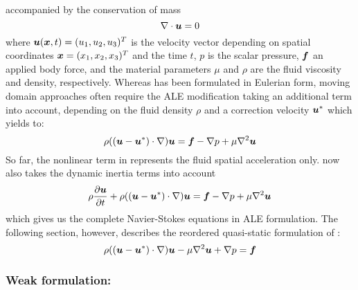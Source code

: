 accompanied by the conservation of mass
\begin{equation}
  \diverg{\vect{u}}=0
  \label{eqn:NavierStokesmasequation}
\end{equation}
where $\vect{u}(\vect{x},t)=(u_1,u_2,u_3)^T$ is the velocity vector depending on spatial coordinates $\vect{x}=(x_1,x_2,x_3)^T$ and the time $t$, $p$ is the scalar pressure, $\vect{f}$ an applied body force, and the material parameters $\mu$ and $\rho$ are the fluid viscosity and density, respectively. Whereas  has been formulated in Eulerian form, moving domain approaches often require the ALE modification taking an additional term into account, depending on the fluid density $\rho$ and a correction velocity $\vect{u}^*$ which yields to:
\begin{equation}
    \rho((\vect{u}-\vect{u}^*)\cdot\grad)\vect{u}=\vect{f}-\grad{p}+\mu\laplacian{\vect{u}}
  \label{eqn:NavierStokesequationALE}
\end{equation}
So far, the nonlinear term in  represents the fluid spatial acceleration only.  now also takes the dynamic inertia terms into account
\begin{equation}
    \rho\delby{\vect{u}}{t}+ \rho((\vect{u}-\vect{u}^*)\cdot\grad)\vect{u}=\vect{f}-\grad{p}+\mu\laplacian{\vect{u}}
  \label{eqn:NavierStokesequation2}
\end{equation}
which gives us the complete Navier-Stokes equations in ALE formulation.
The following section, however, describes the reordered quasi-static formulation of  :
\begin{equation}
\rho((\vect{u}-\vect{u}^*)\cdot\grad)\vect{u}-\mu\laplacian{\vect{u}}+\grad{p}=\vect{f}
  \label{eqn:NavierStokesequationALE2}
\end{equation}

\subsubsection{Weak formulation:}


